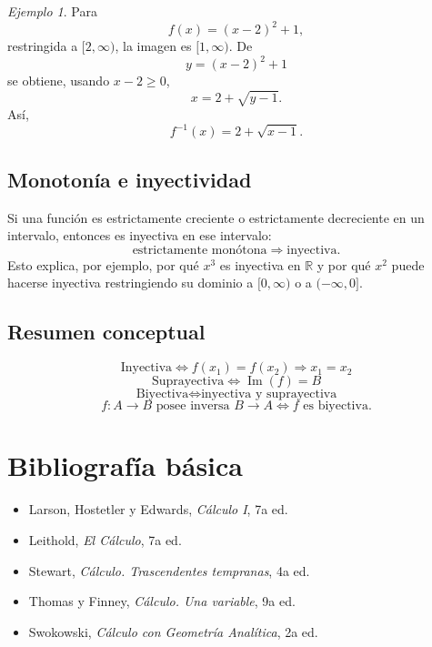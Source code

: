 \documentclass[12pt]{article}
\theoremstyle{remark}
\newtheorem{ejemplo}{Ejemplo}[section]
\begin{document}
\begin{ejemplo}
Para
\[
f(x)=(x-2)^2+1,
\]
restringida a $[2,\infty)$, la imagen es $[1,\infty)$. De
\[
y=(x-2)^2+1
\]
se obtiene, usando $x-2\ge0$,
\[
x=2+\sqrt{y-1}.
\]
Así,
\[
\boxed{f^{-1}(x)=2+\sqrt{x-1}.}
\]
\end{ejemplo}
\subsection*{Monotonía e inyectividad}
Si una función es estrictamente creciente o estrictamente decreciente en un intervalo, entonces es inyectiva en ese intervalo:
\[
\boxed{\text{estrictamente monótona}\Longrightarrow\text{inyectiva}.}
\]
Esto explica, por ejemplo, por qué $x^3$ es inyectiva en $\mathbb R$ y por qué $x^2$ puede hacerse inyectiva restringiendo su dominio a $[0,\infty)$ o a $(-\infty,0]$.

\subsection*{Resumen conceptual}
\[
\boxed{\text{Inyectiva}\iff f(x_1)=f(x_2)\Rightarrow x_1=x_2}
\]
\[
\boxed{\text{Suprayectiva}\iff\operatorname{Im}(f)=B}
\]
\[
\boxed{\text{Biyectiva}\iff\text{inyectiva y suprayectiva}}
\]
\[
\boxed{f:A\to B\text{ posee inversa }B\to A\iff f\text{ es biyectiva}.}
\]
\section*{Bibliografía básica}

\begin{itemize}
    \item Larson, Hostetler y Edwards, \emph{Cálculo I}, 7a ed.
    \item Leithold, \emph{El Cálculo}, 7a ed.
    \item Stewart, \emph{Cálculo. Trascendentes tempranas}, 4a ed.
    \item Thomas y Finney, \emph{Cálculo. Una variable}, 9a ed.
    \item Swokowski, \emph{Cálculo con Geometría Analítica}, 2a ed.
\end{itemize}
\end{document}
